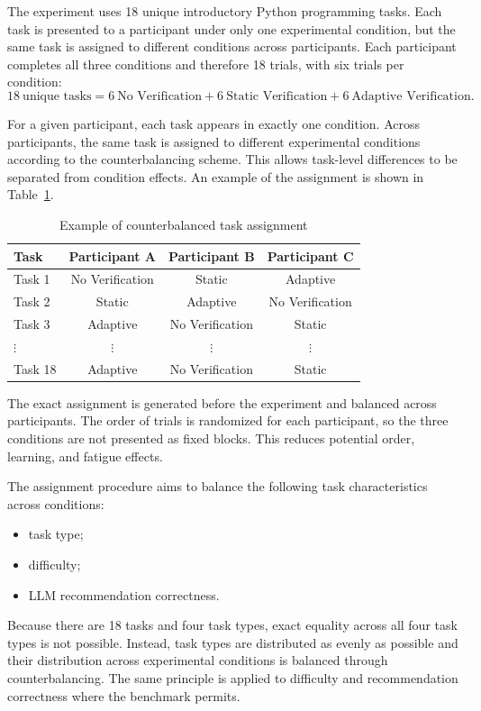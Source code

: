 \documentclass[oneside,final,14pt,a4paper]{extreport}
\theoremstyle{definition}
\theoremstyle{remark}
\begin{document}
The experiment uses 18 unique introductory Python programming tasks. Each task
is presented to a participant under only one experimental condition, but the
same task is assigned to different conditions across participants. Each
participant completes all three conditions and therefore 18 trials, with six
trials per condition:
\[
18\ \text{unique tasks}
=
6\ \text{No Verification}
+
6\ \text{Static Verification}
+
6\ \text{Adaptive Verification}.
\]

For a given participant, each task appears in exactly one condition. Across
participants, the same task is assigned to different experimental conditions
according to the counterbalancing scheme. This allows task-level differences to
be separated from condition effects. An example of the assignment is shown in
Table~\ref{tab:counterbalancing}.

\begin{table}[ht]
\centering
\caption{Example of counterbalanced task assignment}
\label{tab:counterbalancing}
\begin{tabular}{lccc}
\toprule
\textbf{Task} & \textbf{Participant A} &
\textbf{Participant B} & \textbf{Participant C} \\
\midrule
Task 1 & No Verification & Static & Adaptive \\
Task 2 & Static & Adaptive & No Verification \\
Task 3 & Adaptive & No Verification & Static \\
 $\vdots$ & $\vdots$ & $\vdots$ & $\vdots$ \\
Task 18 & Adaptive & No Verification & Static \\
\bottomrule
\end{tabular}
\end{table}

The exact assignment is generated before the experiment and balanced across
participants. The order of trials is randomized for each participant, so the
three conditions are not presented as fixed blocks. This reduces potential
order, learning, and fatigue effects.

The assignment procedure aims to balance the following task characteristics
across conditions:
\begin{itemize}
    \item task type;
    \item difficulty;
    \item LLM recommendation correctness.
\end{itemize}

Because there are 18 tasks and four task types, exact equality across all four
task types is not possible. Instead, task types are distributed as evenly as
possible and their distribution across experimental conditions is balanced
through counterbalancing. The same principle is applied to difficulty and
recommendation correctness where the benchmark permits.
\end{document}
